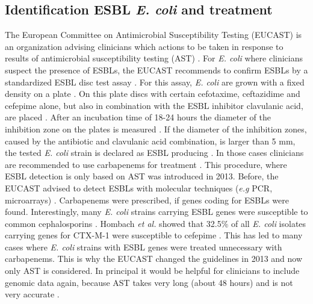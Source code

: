 \subsection{Identification ESBL \textit{E. coli} and treatment}
The European Committee on Antimicrobial Susceptibility Testing (EUCAST) is an organization advising clinicians which actions to be taken in response to results of  antimicrobial susceptibility testing (AST) \cite{leclercq_eucast_2013}. For \textit{E. coli} where clinicians suspect the presence of ESBLs, the EUCAST recommends to confirm ESBLs by a standardized ESBL disc test assay \cite{hombach_consequences_2013}. For this assay, \textit{E. coli} are grown with a fixed density on a plate \cite{disc_test}. On this plate discs with certain cefotaxime, ceftazidime and cefepime alone, but also in combination with the ESBL inhibitor clavulanic acid, are placed \cite{disc_test}. After an incubation time of 18-24 hours the diameter of the inhibition zone on the plates is measured \cite{disc_test}. If the diameter of the inhibition zones, caused by the antibiotic and clavulanic acid combination, is larger than 5 mm, the tested \textit{E. coli} strain is declared as ESBL producing \cite{disc_test}. In those cases clinicians are recommended to use carbapenems for treatment \cite{mcwilliams_incidence_2014}. This procedure, where ESBL detection is only based on AST was introduced in 2013. Before, the EUCAST advised to detect ESBLs with molecular techniques (\textit{e.g} PCR, microarrays) \cite{screening}. Carbapenems were prescribed, if genes coding for ESBLs were found. Interestingly, many \textit{E. coli} strains carrying ESBL genes were susceptible to common cephalosporins \cite{hombach_consequences_2013}.
Hombach \textit{et al.} showed that 32.5\% of all \textit{E. coli} isolates carrying genes for CTX-M-1 were susceptible to cefepime \cite{hombach_consequences_2013}. This has led to many cases where \textit{E. coli} strains with ESBL genes were treated unnecessary with carbapenems. This is why the EUCAST changed the guidelines in 2013 and now only AST is considered. In principal it would be helpful for clinicians to include genomic data again, because AST takes very long (about 48 hours) and is not very accurate \cite{disc_test}\cite{hombach_consequences_2013}.

